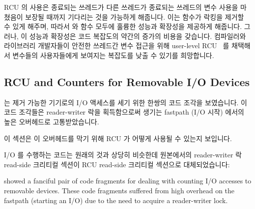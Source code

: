 RCU 의 사용은 종료되는 쓰레드가 다른 쓰레드가 종료되는 쓰레드의 
변수 사용을 마쳤음이 보장될 때까지 기다리는 것을 가능하게 해줍니다.
이는  함수가 락킹을 제거할 수 있게 해주며, 따라서
 와  함수 모두에 훌륭한 성능과 확장성을
제공하게 해줍니다.
그러나, 이 성능과 확장성은 코드 복잡도의 약간의 증가의 비용을 갖습니다.
컴파일러와 라이브러리 개발자들이 안전한 쓰레드간  변수 접근을 위해
user-level RCU~\cite{MathieuDesnoyers2009URCU} 를 채택해서 
변수들의 사용자들에게 보여지는 복잡도를 낮출 수 있기를 희망합니다.

\iffalse

Use of RCU enables exiting threads to wait until other threads are
guaranteed to be done using the exiting threads' \co{__thread} variables.
This allows the \co{read_count()} function to dispense with locking,
thereby providing
excellent performance and scalability for both the \co{inc_count()}
and \co{read_count()} functions.
However, this performance and scalability come at the cost of some increase
in code complexity.
It is hoped that compiler and library writers employ user-level
RCU~\cite{MathieuDesnoyers2009URCU} to provide safe cross-thread
access to \co{__thread} variables, greatly reducing the
complexity seen by users of \co{__thread} variables.

\fi

\subsection{RCU and Counters for Removable I/O Devices}
\label{sec:together:RCU and Counters for Removable I/O Devices}

는 제거 가능한 기기로의 I/O 액세스를 세기 위한 한쌍의 코드 조각을 보였습니다.
이 코드 조각들은 reader-writer 락을 획득함으로써 생기는 fastpath (I/O 시작)
에서의 높은 오버헤드로 고통받았습니다.

이 섹션은 이 오버헤드를 막기 위해 RCU 가 어떻게 사용될 수 있는지 보입니다.

I/O 를 수행하는 코드는 원래의 것과 상당히 비슷한데 원본에서의 reader-writer 락
read-side 크리티컬 섹션이 RCU read-side 크리티컬 섹션으로 대체되었습니다:

\iffalse

showed a fanciful pair of code fragments for dealing with counting
I/O accesses to removable devices.
These code fragments suffered from high overhead on the fastpath
(starting an I/O) due to the need to acquire a reader-writer
lock.

